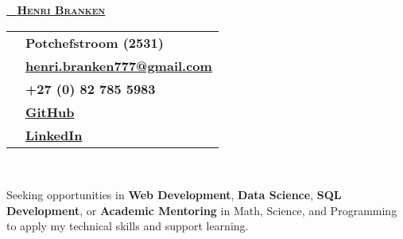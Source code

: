 \documentclass[a4paper,10pt]{article}
\begin{document}
\begin{center}
	{\Huge\textbf{\href{https://henribranken.github.io/MyCV/}{\faHandPointer~ \textsc{Henri Branken}}}}\\[0.5cm]
\end{center}
\begin{minipage}{0.7\textwidth}
	\begin{tcolorbox}[
		colback=teal!10, %
		colframe=teal,   %
		boxrule=1pt, %
		width=0.8\textwidth,
		left=10pt, right=10pt, %
		sharp corners=northwest
		]
		\begin{tabularx}{\textwidth}{c X}
			\faHome & \textbf{Potchefstroom (2531)} \\[0.2cm]
			\faEnvelope & \href{mailto:henri.branken777@gmail.com}{\textbf{henri.branken777@gmail.com}} \\[0.2cm]
			\faPhone & \textbf{+27 (0) 82 785 5983} \\[0.2cm]
			\faGithub & \href{https://github.com/HenriBranken}{\textbf{GitHub}} \\[0.2cm]
			\faLinkedin & \href{https://www.linkedin.com/in/henri-branken-1423a2153/}{\textbf{LinkedIn}}
		\end{tabularx}
	\end{tcolorbox}
\end{minipage}
\hfill
\begin{minipage}{0.3\textwidth}
\end{minipage}\\[0.5cm]

\begin{tcolorbox}[
	colback=burntshade,    %
	colframe=burnt,     %
	boxrule=1pt,        %
	sharp corners=northwest,
	rounded corners=southwest,
	coltitle=white,     %
	fonttitle=\large\bfseries\scshape,  %
	title=Career Objective,
	width=\textwidth,   %
	left=10pt, right=10pt, top=5pt, bottom=5pt  %
	]
	Seeking opportunities in \textbf{Web Development}, \textbf{Data Science}, \textbf{SQL Development}, or \textbf{Academic Mentoring} in Math, Science, and Programming to apply my technical skills and support learning.
\end{tcolorbox}
\end{document}
